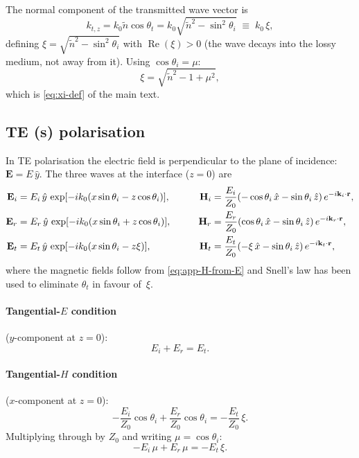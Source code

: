\documentclass[11pt,a4paper]{article}
\theoremstyle{definition}      %
\newcommand{\rr}{\mathbf{r}}
\newcommand{\EE}{\mathbf{E}}
\newcommand{\HH}{\mathbf{H}}
\newcommand{\ntilde}{\tilde{n}}
\DeclareMathOperator{\RE}{Re}
\begin{document}
The normal component of the transmitted wave vector is
\begin{equation}\label{eq:app-ktz}
  k_{t,z} = k_0\ntilde\cos\theta_t
  = k_0\sqrt{\ntilde^2 - \sin^2\!\theta_i}
  \;\equiv\; k_0\,\xi,
\end{equation}
defining $\xi=\sqrt{\ntilde^2-\sin^2\!\theta_i}$ with
$\RE(\xi)>0$ (the wave decays into the lossy medium, not away from
it).  Using $\cos\theta_i=\mu$:
\begin{equation}
  \xi = \sqrt{\ntilde^2 - 1 + \mu^2},
\end{equation}
which is \cref{eq:xi-def} of the main text.

\subsection{TE (s) polarisation}
\label{app:fresnel-TE}

In TE polarisation the electric field is perpendicular to the plane
of incidence: $\EE=E\,\hat{y}$.  The three waves at the interface
($z=0$) are
\begin{alignat}{2}
  \EE_i &= E_i\,\hat{y}\,\exp[-ik_0(x\sin\theta_i - z\cos\theta_i)],
  &\qquad
  \HH_i &= \frac{E_i}{Z_0}(-\cos\theta_i\,\hat{x} - \sin\theta_i\,\hat{z})\,e^{-i\mathbf{k}_i\cdot\rr},
  \notag\\
  \EE_r &= E_r\,\hat{y}\,\exp[-ik_0(x\sin\theta_i + z\cos\theta_i)],
  &\qquad
  \HH_r &= \frac{E_r}{Z_0}(\cos\theta_i\,\hat{x} - \sin\theta_i\,\hat{z})\,e^{-i\mathbf{k}_r\cdot\rr},
  \notag\\
  \EE_t &= E_t\,\hat{y}\,\exp[-ik_0(x\sin\theta_i - z\xi)],
  &\qquad
  \HH_t &= \frac{E_t}{Z_0}(-\xi\,\hat{x} - \sin\theta_i\,\hat{z})\,e^{-i\mathbf{k}_t\cdot\rr},
\end{alignat}
where the magnetic fields follow from \cref{eq:app-H-from-E} and
Snell's law has been used to eliminate $\theta_t$ in favour of~$\xi$.

\paragraph{Tangential-$E$ condition} ($y$-component at $z=0$):
\begin{equation}\label{eq:app-TE-Ey}
  E_i + E_r = E_t.
\end{equation}

\paragraph{Tangential-$H$ condition} ($x$-component at $z=0$):
\begin{equation}\label{eq:app-TE-Hx}
  -\frac{E_i}{Z_0}\cos\theta_i + \frac{E_r}{Z_0}\cos\theta_i
  = -\frac{E_t}{Z_0}\,\xi.
\end{equation}
Multiplying through by $Z_0$ and writing $\mu=\cos\theta_i$:
\begin{equation}
  -E_i\,\mu + E_r\,\mu = -E_t\,\xi.
\end{equation}
\end{document}
